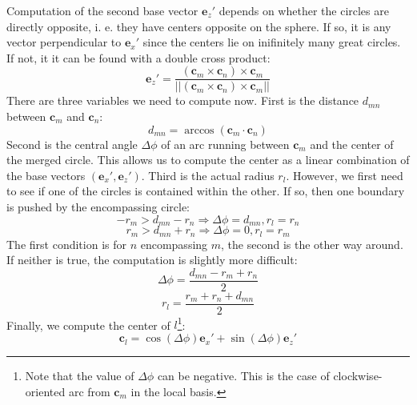 Computation of the second base vector $\mathbf{e}_z'$ depends on whether the circles are directly opposite, i. e. they have centers opposite on the sphere. If so, it is any vector perpendicular to $\mathbf{e}_x'$ since the centers lie on inifinitely many great circles. If not, it it can be found with a double cross product:
$$\mathbf{e}_z'=\frac{(\mathbf{c}_m\times\mathbf{c}_n)\times\mathbf{c}_m}{||(\mathbf{c}_m\times\mathbf{c}_n)\times\mathbf{c}_m||}$$
There are three variables we need to compute now. First is the distance $d_{mn}$ between $\mathbf{c}_m$ and $\mathbf{c}_n$:
$$d_{mn}=\arccos(\mathbf{c}_m\cdot\mathbf{c}_n)$$
Second is the central angle $\Delta\phi$ of an arc running between $\mathbf{c}_m$ and the center of the merged circle. This allows us to compute the center as a linear combination of the base vectors $(\mathbf{e}_x', \mathbf{e}_z')$. Third is the actual radius $r_l$. However, we first need to see if one of the circles is contained within the other. If so, then one boundary is pushed by the encompassing circle:
$$-r_m > d_{mn} - r_n \Longrightarrow \Delta\phi=d_{mn}, r_l = r_n$$
$$r_m > d_{mn} +  r_n \Longrightarrow \Delta\phi=0, r_l = r_m$$
The first condition is for $n$ encompassing $m$, the second is the other way around. If neither is true, the computation is slightly more difficult:
$$\Delta\phi=\frac{d_{mn}-r_m+r_n}{2}$$
$$r_l=\frac{r_m + r_n + d_{mn}}{2}$$
Finally, we compute the center of $l$\footnote{Note that the value of $\Delta\phi$ can be negative. This is the case of clockwise-oriented arc from $\mathbf{c}_m$ in the local basis.}:
$$\mathbf{c}_l=\cos(\Delta\phi)\mathbf{e}_x' + \sin(\Delta\phi)\mathbf{e}_z'$$
